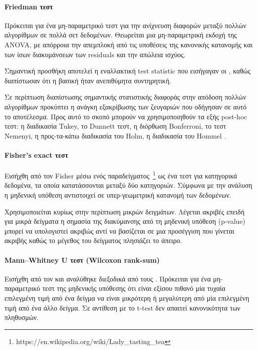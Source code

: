 \paragraph{Friedman τεστ}
Πρόκειται για ένα μη-παραμετρικό τεστ για την ανίχνευση διαφορών μεταξύ πολλών αλγορίθμων σε πολλά σετ δεδομένων. Θεωρείται μια μη-παραμετρική εκδοχή της ANOVA, με απόρροια την απεμπλοκή από τις υποθέσεις της κανονικής κατανομής και των ίσων διακυμάνσεων των residuals και την απώλεια ισχύος.  

Σημαντική προσθήκη αποτελεί η εναλλακτική test statistic που εισήγαγαν οι \citet{doi:10.1080/03610928008827904}, καθώς διαπίστωσαν ότι η βασική ήταν ανεπιθύμητα συντηρητική. 

Σε περίπτωση διαπίστωσης σημαντικής στατιστικής διαφοράς στην απόδοση πολλών αλγορίθμων προκύπτει η ανάγκη εξακρίβωσης των ζευγαριών που οδήγησαν σε αυτό το αποτέλεσμα. Προς αυτό το σκοπό μπορούν να χρησιμοποιηθούν τα εξής post-hoc τεστ: η διαδικασία Tukey, το Dunnett τεστ, η διόρθωση Bonferroni, το τεστ Nemenyi, η προς-τα-κάτω διαδικασία του Holm, η διαδικασία του Hommel \citep{CIS-57999, citeulike:4294367, doi:10.1093/biomet/75.2.383}.
\paragraph{Fisher's exact τεστ}
 Εισήχθη από τον Fisher μέσω ενός παραδείγματος~\footnote{https://en.wikipedia.org/wiki/Lady\_tasting\_tea} ως ένα τεστ για κατηγορικά δεδομένα, τα οποία κατατάσσονται μεταξύ δύο κατηγοριών. Σύμφωνα με την ανάλυση η μηδενική υπόθεση αντιστοιχεί σε υπερ-γεωμετρική κατανομή των δεδομένων.
  
 Χρησιμοποιείται κυρίως στην περίπτωση μικρών δειγμάτων. Λέγεται ακριβές επειδή για μικρά δείγματα η σημασία της διακύμανσης από τη μηδενική υπόθεση (p-value) μπορεί να υπολογιστεί ακριβώς αντί να βασίζεται σε μια προσέγγιση που γίνεται ακριβής καθώς το μέγεθος του δείγματος πλησιάζει το άπειρο.
\paragraph{Mann–Whitney U τεστ (Wilcoxon rank-sum)} Εισήχθη από τον \citet{Wilcoxon45} και αναλύθηκε διεξοδικά από τους \citet{mann1947}. Πρόκειται για ένα μη-παραμετρικό τεστ της μηδενικής υπόθεσης ότι είναι εξίσου πιθανό μία τυχαία επιλεγμένη τιμή από ένα δείγμα να είναι μικρότερη ή μεγαλύτερη από μία επιλεγμένη τιμή από ένα άλλο δείγμα. Σε αντίθεση με το t-test δεν απαιτεί κανονικότητα των πληθυσμών.
 
